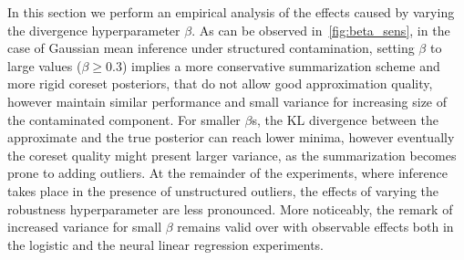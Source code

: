 In this section we perform an empirical analysis of the effects caused by varying the divergence hyperparameter $\beta$. As can be observed in~\cref{fig:beta_sens}, in the case of Gaussian mean inference under structured contamination, setting $\beta$ to large values ($\beta \geq 0.3$) implies a more conservative summarization scheme and more rigid coreset posteriors, that do not allow good approximation quality, however maintain similar performance and small variance for increasing size of the contaminated component. For smaller $\beta$s, the KL divergence between the approximate and the true posterior can reach lower minima, however eventually the coreset quality might present larger variance, as the summarization becomes prone to adding outliers. At the remainder of the experiments, where inference takes place in the presence of unstructured outliers, the effects of varying the robustness hyperparameter are less pronounced. More noticeably, the remark of increased variance for small $\beta$ remains valid over with observable effects both in the logistic and the neural linear regression experiments.


